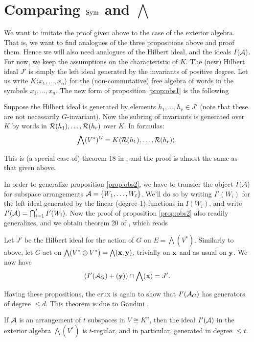 \documentclass[../main.tex]{subfiles}
\begin{document}
\section{Comparing $\operatorname{Sym}$ and $\bigwedge$}
We want to imitate the proof given above to the case of the exterior algebra.
That is, we want to find analogues of the three propositions above and
proof them. Hence we will also need analogues of the Hilbert ideal, and the 
ideals $I(\mathcal{A})$.
For now, we keep the assumptions on the characteristic of $K$.
The (new) Hilbert ideal $J'$ is simply the left ideal generated by the
invariants of positive degree.
Let us write $K\langle x_1, \dots, x_n \rangle$ for the (non-commutative) free
algebra of words in the symbols $x_1, \dots, x_n$. 
The new form of proposition \ref{prop:obs1} is the following
\begin{prop}\label{prop:newobs1}
    Suppose the Hilbert ideal is generated by elements $h_1, \dots, h_r \in J'$ 
    (note that these are not necessarily $G$-invariant). Now the subring of invariants
    is generated over $K$ by words in $\mathcal{R}(h_1), \dots, \mathcal{R}(h_r)$ over $K$. In
    formulas:
    \begin{equation*}
        \bigwedge(V^*)^G = K\langle\mathcal{R}(h_1), \dots, \mathcal{R}(h_r)\rangle.
    \end{equation*}
\end{prop}
This is (a special case of) theorem 18 in \cite{gandini2021degree}, and the proof
is almost the same as that given above.

In order to generalize proposition \ref{prop:obs2}, we have to transfer 
the object $I(\mathcal{A})$ for subspace arrangements $\mathcal{A} = \{W_1, \dots, W_t\}$. We'll 
do so by writing $I'(W_i)$ for the left ideal generated by the linear
(degree-1)-functions in $I(W_i)$, and write $I'(\mathcal{A}) = \bigcap_{i = 1}^t
I'(W_i).$ Now the proof of proposition \ref{prop:obs2} also readily
generalizes, and we obtain theorem 20 of \cite{gandini2021degree}, which reads
\begin{prop}
    Let $J'$ be the Hilbert ideal for the action of $G$ on $E = \bigwedge(V^*)$.
    Similarly to above, let $G$ act on $\bigwedge(V^* \oplus V^*) =
    \bigwedge(\mathbf{x}, \mathbf{y})$, trivially on $\mathbf{x}$ and as usual on $\mathbf{y}$. We now have
    \begin{equation*}
        (I'(\mathcal{A}_G) + (\mathbf{y})) \cap \bigwedge(\mathbf{x}) = J'.
    \end{equation*}
\end{prop}

Having these propositions, the crux is again to show that $I'(\mathcal{A}_G)$ has
generators of degree $\leq d$. This theorem is due to Gandini \cite[Theorem 9]{gandini2021degree}.
\begin{thm}\label{thm:newcrux}
    If $\mathcal{A}$ is an arrangement of $t$ subspaces in $V \cong K^n$, then the
    ideal $I'(\mathcal{A})$ in the exterior algebra $\bigwedge(V^*)$ is $t$-regular,
    and in particular, generated in degree $\leq t$. 
\end{thm}
\end{document}
